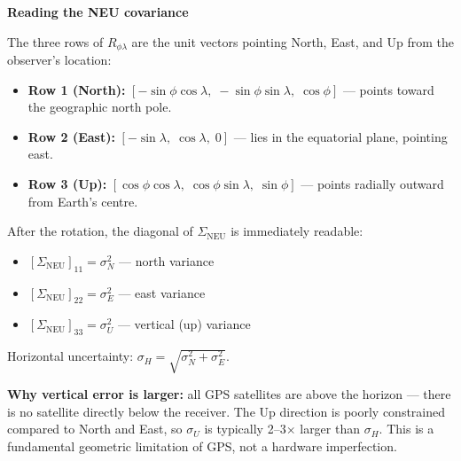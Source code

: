 \documentclass[12pt, a4paper]{article}
\begin{document}
\begin{notebox}
  \textbf{Reading the NEU covariance}

  The three rows of $R_{\phi\lambda}$ are the unit vectors pointing
  North, East, and Up from the observer's location:
  \begin{itemize}[leftmargin=1.5em, itemsep=2pt]
    \item \textbf{Row 1 (North):}
      $[-\sin\phi\cos\lambda,\;-\sin\phi\sin\lambda,\;\cos\phi]$ ---
      points toward the geographic north pole.
    \item \textbf{Row 2 (East):}
      $[-\sin\lambda,\;\cos\lambda,\;0]$ ---
      lies in the equatorial plane, pointing east.
    \item \textbf{Row 3 (Up):}
      $[\cos\phi\cos\lambda,\;\cos\phi\sin\lambda,\;\sin\phi]$ ---
      points radially outward from Earth's centre.
  \end{itemize}

  After the rotation, the diagonal of $\Sigma_\text{NEU}$ is immediately
  readable:
  \begin{itemize}[leftmargin=1.5em, itemsep=1pt]
    \item $[\Sigma_\text{NEU}]_{11} = \sigma_N^2$ --- north variance
    \item $[\Sigma_\text{NEU}]_{22} = \sigma_E^2$ --- east variance
    \item $[\Sigma_\text{NEU}]_{33} = \sigma_U^2$ --- vertical (up)
      variance
  \end{itemize}
  Horizontal uncertainty: $\sigma_H = \sqrt{\sigma_N^2 + \sigma_E^2}$.

  \textbf{Why vertical error is larger:}
  all GPS satellites are above the horizon --- there is no satellite
  directly below the receiver.
  The Up direction is poorly constrained compared to North and East,
  so $\sigma_U$ is typically 2--3$\times$ larger than $\sigma_H$.
  This is a fundamental geometric limitation of GPS, not a hardware
  imperfection.
\end{notebox}
\end{document}
